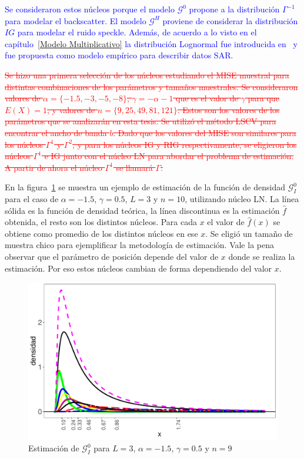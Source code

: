 \textcolor{blue}{
Se consideraron estos núcleos porque el modelo $\mathcal{G}^0$ propone a la distribución $\Gamma^{-1}$ para modelar el backscatter. El modelo $\mathcal{G}^H$ proviene de considerar la distribución $IG$ para modelar el ruido speckle. Además, de acuerdo a lo visto en el capítulo~\ref{Modelo Multiplicativo} la distribución Lognormal fue introducida en~\cite{oliverquegan98} y fue propuesta como modelo empírico para describir datos SAR.
}

\textcolor{red}{\sout{
Se hizo una primera selección de los núcleos estudiando el MISE muestral para distintas combinaciones de los parámetros y tamaños muestrales. Se consideraron valores de $\alpha=\{-1.5,-3,-5,-8\}$, $\gamma=-\alpha-1$ que es el valor de $\gamma$ para que $E(X)=1$, y valores de $n=\{9,25,49,81,121\}$. Estos son los valores de los parámetros que se analizarán en esta tesis. Se utilizó el método LSCV para encontrar el ancho de banda $b$. Dado que los valores del MISE son similares para los núcleos $\Gamma^1$ y $\Gamma^2$, y para los núcleos IG y RIG respectivamente, se eligieron los núcleos $\Gamma^1$ e IG junto con el núcleo LN para abordar el problema de estimación. A partir de ahora el núcleo $\Gamma^1$ se llamará $\Gamma$.
}}

En la figura~\ref{EstimacionLN} se muestra un ejemplo de estimación de la función de densidad $\mathcal{G}_I^0$ para el caso de $\alpha=-1.5$, $\gamma=0.5$, $L=3$ y $n=10$, utilizando núcleo LN. La línea sólida es la función de densidad teórica, la línea discontinua es la estimación $\widehat{f}$ obtenida, el resto son los distintos núcleos. Para cada $x$ el valor de $\widehat{f}(x)$ se obtiene como promedio de los distintos núcleos en ese $x$. Se eligió un tamaño de muestra chico para ejemplificar la metodología de estimación. Vale la pena observar que el parámetro de posición depende del valor de $x$ donde se realiza la estimación. Por eso estos núcleos cambian de forma dependiendo del valor $x$.

\begin{figure}[hbt]
	\centering
	\includegraphics[scale=0.5]{../../Figures/Tesis/Capitulo5/EstimacionDensidadconLN.pdf}
	\caption{\label{EstimacionLN}Estimación de $\mathcal{G}_I^0$ para $L=3$, $\alpha=-1.5$, $\gamma=0.5$ y $n=9$}
\end{figure}

